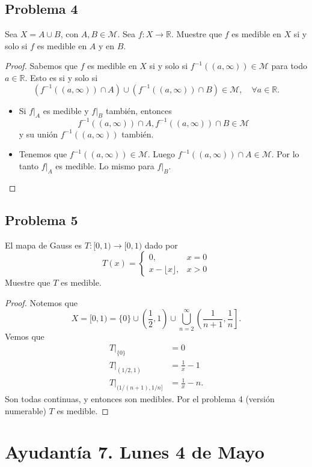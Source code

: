 \documentclass{article}
\theoremstyle{definition}
\theoremstyle{remark}
\numberwithin{equation}{section}
\newcommand{\M}{\mathcal{M}}
\newcommand{\R}{\mathbb{R}}
\newcommand{\oo}{\infty}
\begin{document}
\newpage
\subsection{Problema 4}

Sea $X = A \cup B$, con $A,B \in \M$. Sea $f \colon X \to \R$. Muestre que $f$ es medible en $X$ si y solo si $f$ es medible en $A$ y en $B$.
\begin{proof}
  Sabemos que $f$ es medible en $X$ si y solo si $f^{-1}((a,\oo)) \in \M$ para todo $a \in \R$. Esto es si y solo si 
  \[ (f^{-1}((a,\oo)) \cap A) \cup (f^{-1}((a,\oo)) \cap B) \in \M, \quad \forall a \in \R. \]
  \begin{itemize}
    \item \boxed{\impliedby} Si $f|_A$ es medible y $f|_B$ también, entonces 
    \[ f^{-1}((a,\oo)) \cap A , f^{-1}((a,\oo)) \cap B \in \M \]
    y su unión $f^{-1}((a,\oo))$ también.

    \item \boxed{\implies} Tenemos que $f^{-1}((a,\oo)) \in \M$. Luego $f^{-1}((a,\oo)) \cap A \in \M$. Por lo tanto $f|_A$ es medible. Lo mismo para $f|_B$.
  \end{itemize}
\end{proof}

\newpage
\subsection{Problema 5}
El mapa de Gauss es $T \colon [0,1) \to [0,1)$ dado por 
\[ T(x) = \begin{cases}
  0, &x = 0 \\
  x - \lfloor x \rfloor , &x > 0
\end{cases} \]
Muestre que $T$ es medible.
\begin{proof}
  Notemos que 
  \[ X = [0,1) = \{0\} \cup \left( \frac{1}{2},1 \right) \cup \bigcup_{n=2}^\oo \left( \frac{1}{n+1}, \frac{1}{n} \right]. \]
  Vemos que 
  \begin{align*}
      T|_{\{0\}} &= 0 \\
      T|_{(1/2,1)} &= \frac{1}{x} - 1 \\
      T|_{(1/(n+1), 1/n]} &= \frac{1}{x} - n.
  \end{align*}
  Son todas continuas, y entonces son medibles. Por el problema 4 (versión numerable) $T$ es medible.
\end{proof}


\newpage
\section{Ayudantía 7. Lunes 4 de Mayo}
\end{document}

